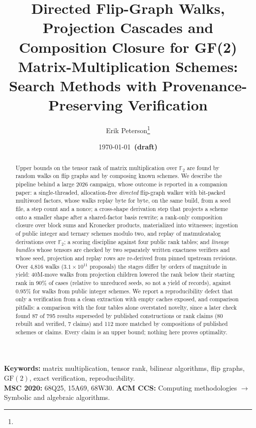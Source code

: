 \documentclass[11pt]{article}
\title{Directed Flip-Graph Walks, Projection Cascades and\\
Composition Closure for GF(2) Matrix-Multiplication Schemes:\\
Search Methods with Provenance-Preserving Verification}
\author{Erik Peterson\thanks{\todo{affiliation and contact e-mail}}}
\date{\today\ \textbf{(draft)}}
\newcommand{\F}{{\mathbb{F}_2}}
\theoremstyle{plain}
\theoremstyle{definition}
\begin{document}
\maketitle

\begin{abstract}
Upper bounds on the tensor rank of matrix multiplication over $\F$ are found by random walks on flip graphs and by composing known schemes.
We describe the pipeline behind a large 2026 campaign, whose outcome is reported in a companion paper: a single-threaded, allocation-free \emph{directed} flip-graph walker with bit-packed multiword factors, whose walks replay byte for byte, on the same build, from a seed file, a step count and a nonce; a cross-shape derivation step that projects a scheme onto a smaller shape after a shared-factor basis rewrite; a rank-only composition closure over block sums and Kronecker products, materialized into witnesses; ingestion of public integer and ternary schemes modulo two, and replay of matmulcatalog derivations over $\F$; a scoring discipline against four public rank tables; and \emph{lineage bundles} whose tensors are checked by two separately written exactness verifiers and whose seed, projection and replay rows are re-derived from pinned upstream revisions.
Over 4{,}816 walks (\(3.1\times10^{11}\) proposals) the stages differ by orders of magnitude in yield: 40M-move walks from projection children lowered the rank below their starting rank in 90\% of cases (relative to unreduced seeds, so not a yield of records), against 0.95\% for walks from public integer schemes.
We report a reproducibility defect that only a verification from a clean extraction with empty caches exposed, and comparison pitfalls: a comparison with the four tables alone overstated novelty, since a later check found 87 of 795 results superseded by published constructions or rank claims (80 rebuilt and verified, 7 claims) and 112 more matched by compositions of published schemes or claims.
Every claim is an upper bound; nothing here proves optimality.
\end{abstract}

\noindent\textbf{Keywords:} matrix multiplication, tensor rank, bilinear algorithms, flip graphs,
$\mathrm{GF}(2)$, exact verification, reproducibility.\\
\textbf{MSC 2020:} 68Q25, 15A69, 68W30. \quad \textbf{ACM CCS:} Computing methodologies $\to$ Symbolic and algebraic algorithms.












\end{document}
